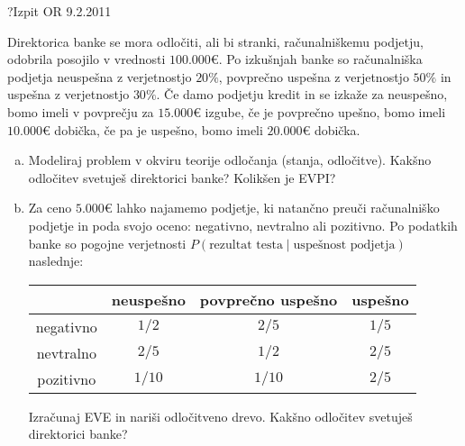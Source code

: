 \begin{naloga}{?}{Izpit OR 9.2.2011}
\begin{vprasanje}
Direktorica banke se mora odločiti, ali bi stranki, računalniškemu podjetju,
odobrila posojilo v vrednosti $100.000 €$.
Po izkušnjah banke so računalniška podjetja neuspešna z verjetnostjo $20 \%$,
povprečno uspešna z verjetnostjo $50 \%$ in uspešna z verjetnostjo $30 \%$.
Če damo podjetju kredit in se izkaže za neuspešno,
bomo imeli v povprečju za $15.000 €$ izgube,
če je povprečno upešno, bomo imeli $10.000 €$ dobička,
če pa je uspešno, bomo imeli $20.000 €$ dobička.
\begin{enumerate}[(a)]
\item Modeliraj problem v okviru teorije odločanja (stanja, odločitve).
Kakšno odločitev svetuješ direktorici banke?
Kolikšen je EVPI?

\item Za ceno $5.000 €$ lahko najamemo podjetje,
ki natančno preuči računalniško podjetje in poda svojo oceno:
negativno, nevtralno ali pozitivno.
Po podatkih banke so pogojne verjetnosti
$P(\text{rezultat testa} \;|\; \text{uspešnost podjetja})$ naslednje:
\begin{center}
\begin{tabular}{c|ccc}
& neuspešno & povprečno uspešno & uspešno \\ \hline
negativno & $1/2$  & $2/5$  & $1/5$ \\
nevtralno & $2/5$  & $1/2$  & $2/5$ \\
pozitivno & $1/10$ & $1/10$ & $2/5$
\end{tabular}
\end{center}
Izračunaj EVE in nariši odločitveno drevo.
Kakšno odločitev svetuješ direktorici banke?
\end{enumerate}
\end{vprasanje}
\begin{odgovor}
\end{odgovor}
\end{naloga}
